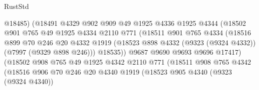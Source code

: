\begin{lexlean}{RustStd}
\begin{coremodule}
{\begin{coremodule}
{{{{{{{{{{{{{{{{{{{{{{{{{{{{{{{{{{{{{{{{{{{                                @18485)
                              (@18491
                                @4329
                                @902
                                @909
                                @49
                                @1925
                                @4336
                                @1925
                                @4344
                                (@18502
                                  @901
                                  @765
                                  @49
                                  @1925
                                  @4334
                                  @2110
                                  @771
                                  (@18511
                                    @901
                                    @765
                                    @4334
                                    (@18516
                                      @899
                                      @70
                                      @246
                                      @20
                                      @4332
                                      @1919
                                      (@18523
                                        @898
                                        @4332
                                        (@9323 (@9324 @4332))
                                        (@7997 (@9329 @898 @246)))
                                      @18535))
                                  @9687
                                  @9690
                                  @9693
                                  @9696
                                  @17417)
                                (@18502
                                  @908
                                  @765
                                  @49
                                  @1925
                                  @4342
                                  @2110
                                  @771
                                  (@18511
                                    @908
                                    @765
                                    @4342
                                    (@18516
                                      @906
                                      @70
                                      @246
                                      @20
                                      @4340
                                      @1919
                                      (@18523
                                        @905
                                        @4340
                                        (@9323 (@9324 @4340))
}}}}}}}}}}}}}}}}}}}}}}}}}}}}}}}}}}}}}}}}}}}
\end{coremodule}}
\end{coremodule}
\end{lexlean}
